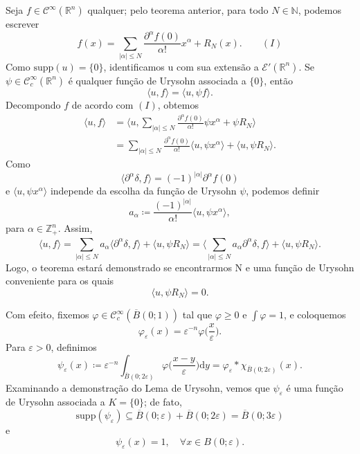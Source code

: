 \documentclass[../distribution_theory_notes.tex]{subfiles}
\begin{document}
\begin{proof*}
	Seja \(f\in \mathcal{C}^{\infty}(\mathbb{R}^{n})\) qualquer; pelo teorema anterior, para todo \(N\in \mathbb{N}\), podemos escrever
	\[
		f(x)=\sum\limits_{|\alpha |\leq N}^{}\frac{\partial^{\alpha }f(0)}{\alpha !}x^{\alpha }+R_{N}(x). \qquad (I)
	\]
	Como \(\mathrm{supp}(u)=\{0\}\), identificamos u com sua extensão a \(\mathcal{E}'(\mathbb{R}^{n})\). Se \(\psi \in \mathcal{C}_{c}^{\infty}(\mathbb{R}^{n})\) é qualquer função de Urysohn associada a \(\{0\}\), então
	\[
		\langle u, f\rangle=\langle u, \psi f\rangle.
	\]
	Decompondo \(f\) de acordo com \((I)\), obtemos
	\begin{align*}
		\langle u, f\rangle
		 & =\biggl\langle u, \sum\limits_{|\alpha |\leq N}^{}\frac{\partial^{\alpha }f(0)}{\alpha !}\psi x^{\alpha }+\psi R_{N}\biggr\rangle        \\
		 & =\sum\limits_{|\alpha |\leq N}^{}\frac{\partial^{\alpha }f(0)}{\alpha !}\langle u, \psi x^{\alpha }\rangle+\langle u, \psi R_{N}\rangle.
	\end{align*}
	Como
	\[
		\langle \partial^{\alpha }\delta , f\rangle=(-1)^{|\alpha |}\partial^{\alpha }f(0)
	\]
	e \(\langle u, \psi x^{\alpha }\rangle\) independe da escolha da função de Urysohn \(\psi \), podemos definir
	\[
		a_{\alpha }\coloneqq \frac{(-1)^{|\alpha |}}{\alpha !}\langle u, \psi x^{\alpha }\rangle,
	\]
	para \(\alpha \in \mathbb{Z}_{+}^{n}\). Assim,
	\[
		\langle u, f\rangle
		=\sum\limits_{|\alpha |\leq N}^{}a_{\alpha }\langle \partial^{\alpha }\delta , f\rangle+\langle u, \psi R_{N}\rangle
		=\biggl\langle \sum\limits_{|\alpha |\leq N}^{}a_{\alpha }\partial^{\alpha }\delta , f\biggr\rangle+\langle u, \psi R_{N}\rangle.
	\]
	Logo, o teorema estará demonstrado se encontrarmos N e uma função de Urysohn conveniente para os quais
	\[
		\langle u, \psi R_{N}\rangle=0.
	\]

	Com efeito, fixemos \(\varphi \in \mathcal{C}_{c}^{\infty}(\overline{B}(0;1))\) tal que \(\varphi \geq 0\) e \(\int \varphi =1\), e coloquemos
	\[
		\varphi_{\varepsilon }(x)=\varepsilon^{-n}\varphi \biggl(\frac{x}{\varepsilon }\biggr).
	\]
	Para \(\varepsilon >0\), definimos
	\[
		\psi_{\varepsilon }(x)
		\coloneqq \varepsilon^{-n}\int_{\overline{B}(0;2\varepsilon )}^{}\varphi \biggl(\frac{x-y}{\varepsilon }\biggr)\mathrm{d}y
		=\varphi_{\varepsilon }*\chi_{\overline{B}(0;2\varepsilon )}(x).
	\]
	Examinando a demonstração do Lema de Urysohn, vemos que \(\psi_{\varepsilon }\) é uma função de Urysohn associada a \(K=\{0\}\); de fato,
	\[
		\mathrm{supp}(\psi_{\varepsilon })
		\subseteq \overline{B}(0;\varepsilon )+\overline{B}(0;2\varepsilon )
		=\overline{B}(0;3\varepsilon )
	\]
	e
	\[
		\psi_{\varepsilon }(x)=1,\quad \forall x\in B(0;\varepsilon ).
	\]


\end{proof*}
\end{document}
